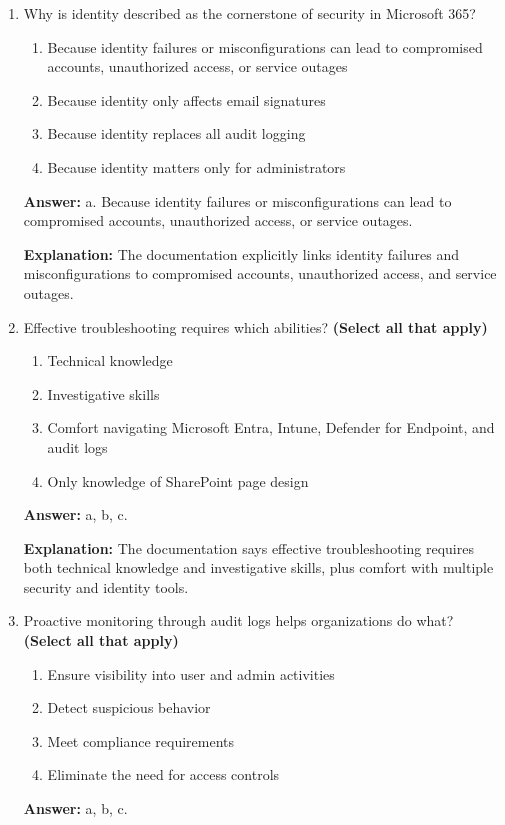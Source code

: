 \documentclass[10pt]{article}
\begin{document}
\begin{enumerate}[leftmargin=*]

\item Why is identity described as the cornerstone of security in Microsoft 365?
\begin{enumerate}[label=\alph*., leftmargin=1.5em]
\item Because identity failures or misconfigurations can lead to compromised accounts, unauthorized access, or service outages
\item Because identity only affects email signatures
\item Because identity replaces all audit logging
\item Because identity matters only for administrators
\end{enumerate}
\textbf{Answer:} a. Because identity failures or misconfigurations can lead to compromised accounts, unauthorized access, or service outages.

\textbf{Explanation:} The documentation explicitly links identity failures and misconfigurations to compromised accounts, unauthorized access, and service outages.

\item Effective troubleshooting requires which abilities? \textbf{(Select all that apply)}
\begin{enumerate}[label=\alph*., leftmargin=1.5em]
\item Technical knowledge
\item Investigative skills
\item Comfort navigating Microsoft Entra, Intune, Defender for Endpoint, and audit logs
\item Only knowledge of SharePoint page design
\end{enumerate}
\textbf{Answer:} a, b, c.

\textbf{Explanation:} The documentation says effective troubleshooting requires both technical knowledge and investigative skills, plus comfort with multiple security and identity tools.

\item Proactive monitoring through audit logs helps organizations do what? \textbf{(Select all that apply)}
\begin{enumerate}[label=\alph*., leftmargin=1.5em]
\item Ensure visibility into user and admin activities
\item Detect suspicious behavior
\item Meet compliance requirements
\item Eliminate the need for access controls
\end{enumerate}
\textbf{Answer:} a, b, c.


\end{enumerate}
\end{document}
